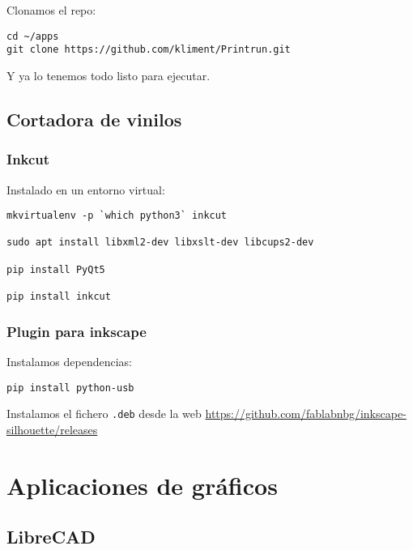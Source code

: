 \documentclass[
  12pt,
  spanish,
]{article}
\begin{document}
Clonamos el repo:

\begin{verbatim}
cd ~/apps
git clone https://github.com/kliment/Printrun.git
\end{verbatim}

Y ya lo tenemos todo listo para ejecutar.

\hypertarget{cortadora-de-vinilos}{%
\subsection{Cortadora de vinilos}\label{cortadora-de-vinilos}}

\hypertarget{inkcut}{%
\subsubsection{Inkcut}\label{inkcut}}

Instalado en un entorno virtual:

\begin{verbatim}
mkvirtualenv -p `which python3` inkcut

sudo apt install libxml2-dev libxslt-dev libcups2-dev

pip install PyQt5

pip install inkcut
\end{verbatim}

\hypertarget{plugin-para-inkscape}{%
\subsubsection{Plugin para inkscape}\label{plugin-para-inkscape}}

Instalamos dependencias:

\begin{verbatim}
pip install python-usb
\end{verbatim}

Instalamos el fichero \texttt{.deb} desde la web
\url{https://github.com/fablabnbg/inkscape-silhouette/releases}

\hypertarget{aplicaciones-de-gruxe1ficos}{%
\section{Aplicaciones de gráficos}\label{aplicaciones-de-gruxe1ficos}}

\hypertarget{librecad}{%
\subsection{LibreCAD}\label{librecad}}
\end{document}
